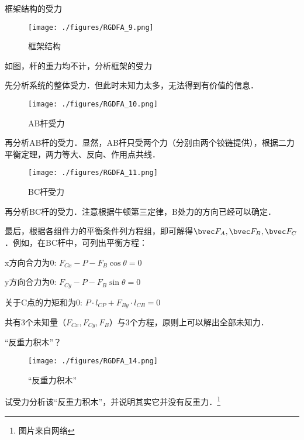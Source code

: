 \begin{example}{框架结构的受力}
\begin{figure}[ht]
\centering
\texttt{[image: ./figures/RGDFA\_9.png]}
\caption{框架结构} \label{RGDFA_fig9}
\end{figure}
如图，杆的重力均不计，分析框架的受力

先分析系统的整体受力．但此时未知力太多，无法得到有价值的信息．

\begin{figure}[ht]
\centering
\texttt{[image: ./figures/RGDFA\_10.png]}
\caption{AB杆受力} \label{RGDFA_fig10}
\end{figure}

再分析AB杆的受力．显然，AB杆只受两个力（分别由两个铰链提供），根据二力平衡定理，两力等大、反向、作用点共线．

\begin{figure}[ht]
\centering
\texttt{[image: ./figures/RGDFA\_11.png]}
\caption{BC杆受力} \label{RGDFA_fig11}
\end{figure}
再分析BC杆的受力．注意根据牛顿第三定律，B处力的方向已经可以确定．

最后，根据各组件力的平衡条件列方程组，即可解得$\bvec F_A, \bvec F_B, \bvec F_C$．例如，在BC杆中，可列出平衡方程：

x方向合力为0: $F_{Cx}-P-F_{B} \cos \theta=0$

y方向合力为0: $F_{Cy}-P-F_{B}\sin \theta=0$

关于C点的力矩和为0: $P \cdot l_{CP} + F_{By} \cdot l_{CB} = 0$

共有3个未知量（$F_{Cx}, F_{Cy}, F_B$）与3个方程，原则上可以解出全部未知力．
\end{example}
\begin{exercise}{“反重力积木”？}
\begin{figure}[ht]
\centering
\texttt{[image: ./figures/RGDFA\_14.png]}
\caption{“反重力积木”} \label{RGDFA_fig14}
\end{figure}
试受力分析该“反重力积木”，并说明其实它并没有反重力．\footnote{图片来自网络}
\end{exercise}
